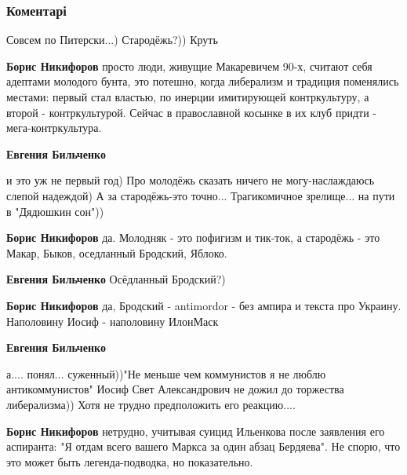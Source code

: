  
 
 
 
 
\subsubsection{Коментарі}
\label{sec:21_11_2021.fb.bilchenko_evgenia.4.missia.cmt}

\begin{itemize} %
Совсем по Питерски...) Стародёжь?)) Круть

\begin{itemize} %
\textbf{Борис Никифоров} просто люди, живущие Макаревичем 90-х, считают себя адептами молодого бунта, это потешно, когда либерализм и традиция поменялись местами: первый стал властью, по инерции имитирующей контркультуру, а второй - контркультурой. Сейчас в православной косынке в их клуб придти - мега-контркультура.

\textbf{Евгения Бильченко} 

и это уж не первый год) Про молодёжь сказать ничего не могу-наслаждаюсь слепой
надеждой) А за стародёжь-это точно... Трагикомичное зрелище... на пути в
"Дядюшкин сон"))

\textbf{Борис Никифоров} да. Молодняк - это пофигизм и тик-ток, а стародёжь - это Макар, Быков, оседланный Бродский, Яблоко.

\textbf{Евгения Бильченко} Осёдланный Бродский?)


\textbf{Борис Никифоров} да, Бродский - antimordor - без ампира и текста про Украину. Наполовину Иосиф - наполовину ИлонМаск

\textbf{Евгения Бильченко} 

а.... понял... суженный))"Не меньше чем коммунистов я не люблю
антикоммунистов" Иосиф Свет Александрович не дожил до торжества
либерализма)) Хотя не трудно предположить его реакцию....

\textbf{Борис Никифоров} нетрудно, учитывая суицид Ильенкова после заявления его аспиранта: "Я отдам всего вашего Маркса за один абзац Бердяева". Не спорю, что это может быть легенда-подводка, но показательно.


\end{itemize}
\end{itemize}
